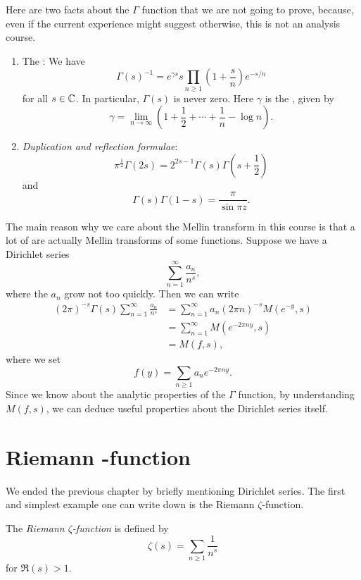 \documentclass[a4paper]{article}
\begin{document}
Here are two facts about the $\Gamma$ function that we are not going to prove, because, even if the current experience might suggest otherwise, this is not an analysis course.
\begin{prop}\leavevmode
  \begin{enumerate}
    \item The : We have
      \[
        \Gamma(s)^{-1} = e^{\gamma s} s \prod_{n \geq 1} \left(1 + \frac{s}{n}\right) e^{-s/n}
      \]
      for all $s \in \mathbb{C}$. In particular, $\Gamma(s)$ is never zero. Here $\gamma$ is the , given by
      \[
        \gamma = \lim_{n \to \infty}\left(1 + \frac{1}{2} + \cdots + \frac{1}{n} - \log n\right).
      \]
    \item \emph{Duplication and reflection formulae}:
      \[
        \pi^{\frac{1}{2}} \Gamma(2s) = 2^{2s - 1} \Gamma(s) \Gamma\left(s + \frac{1}{2}\right)
      \]
      and
      \[
        \Gamma(s) \Gamma(1 - s) = \frac{\pi}{\sin \pi z}.
      \]
  \end{enumerate}
\end{prop}

The main reason why we care about the Mellin transform in this course is that a lot of  are actually Mellin transforms of some functions. Suppose we have a Dirichlet series
\[
  \sum_{n = 1}^\infty \frac{a_n}{n^s},
\]
where the $a_n$ grow not too quickly. Then we can write
\begin{align*}
  (2\pi)^{-s} \Gamma(s)\sum_{n = 1}^\infty \frac{a_n}{n^s} &= \sum_{n = 1}^\infty a_n (2\pi n)^{-s} M(e^{-y}, s)\\
  &= \sum_{n = 1}^\infty M(e^{-2 \pi n y}, s) \\
  &= M(f, s),
\end{align*}
where we set
\[
  f(y) = \sum_{n \geq 1} a_n e^{-2\pi n y}.
\]
Since we know about the analytic properties of the $\Gamma$ function, by understanding $M(f, s)$, we can deduce useful properties about the Dirichlet series itself.

\section{Riemann -function}
We ended the previous chapter by briefly mentioning Dirichlet series. The first and simplest example one can write down is the Riemann $\zeta$-function.
\begin{defi}
  The \emph{Riemann $\zeta$-function} is defined by
  \[
    \zeta(s) = \sum_{n \geq 1} \frac{1}{n^s}
  \]
  for $\Re(s) > 1$.
\end{defi}
\end{document}
